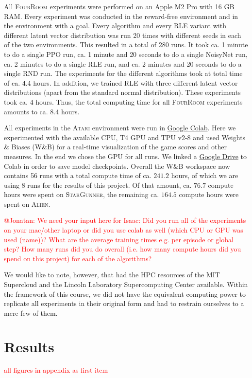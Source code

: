 \documentclass[10pt]{article} %
\begin{document}
\noindent All \textsc{FourRoom} experiments were performed on an Apple M2 Pro with 16 GB RAM. Every experiment was conducted in the reward-free environment and in the environment with a goal. Every algorithm and every RLE variant with different latent vector distribution was run 20 times with different seeds in each of the two environments. This resulted in a total of 280 runs. It took ca. 1 minute to do a single PPO run, ca. 1 minute and 20 seconds to do a single NoisyNet run, ca. 2 minutes to do a single RLE run, and ca. 2 minutes and 20 seconds to do a single RND run. The experiments for the different algorithms took at total time of ca. 4.4 hours. In addition, we trained RLE with three different latent vector distributions (apart from the standard normal distribution). These experiments took ca. 4 hours. Thus, the total computing time for all \textsc{FourRoom} experiments amounts to ca. 8.4 hours.

\noindent All experiments in the \textsc{Atari} environment were run in \href{https://colab.research.google.com/}{Google Colab}. Here we experimented with the available CPU, T4 GPU and TPU v2-8 and used Weights \& Biases (W\&B) for a real-time visualization of the game scores and other measures. In the end we chose the GPU for all runs. We linked a \href{https://drive.google.com}{Google Drive} to Colab in order to save model checkpoints. Overall the W\&B workspace now contains 56 runs with a total compute time of ca. $241.2$ hours, of which we are using 8 runs for the results of this project. Of that amount, ca. $76.7$ compute hours were spent on \textsc{StarGunner}, the remaining ca. $164.5$ compute hours were spent on \textsc{Alien}.

\noindent \textcolor{red}{@Jonatan: We need your input here for Isaac: Did you run all of the experiments on your mac/other laptop or did you use colab as well (which CPU or GPU was used (name))? What are the average training times e.g. per episode or global step? How many runs did you do overall (i.e. how many compute hours did you spend on this project) for each of the algorithms?}

\noindent We would like to note, however, that \cite{rle-paper} had the HPC resources of the MIT Supercloud and the Lincoln Laboratory Supercomputing Center available. Within the framework of this course, we did not have the equivalent computing power to replicate all experiments in their original form and had to restrain ourselves to a mere few of them.

\hypertarget{sec4}{\section{Results}}
\textcolor{red}{all figures in appendix as first item}
\end{document}
